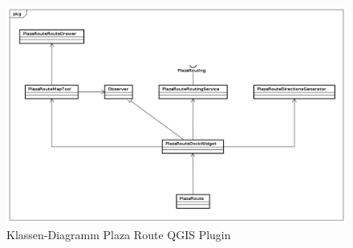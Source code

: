 \begin{figure}[th]
    \centering
    \includegraphics[width=1.0\linewidth]{projectdoc/img/class_diagram_plaza_route_qgis_plugin}
    \caption[Klassen-Diagramm Plaza Route QGIS Plugin]{Klassen-Diagramm Plaza Route QGIS Plugin}
    \label{fig:class_diagram_plaza_route_qgis_plugin}
\end{figure}

